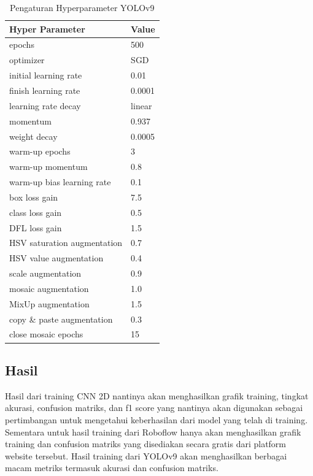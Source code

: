 \begin{table}[H]
  \centering
  \begin{tabular}{|l|l|}
    \hline
    \textbf{Hyper Parameter}    & \textbf{Value} \\ \hline
    epochs                      & 500            \\ \hline
    optimizer                   & SGD            \\ \hline
    initial learning rate       & 0.01           \\ \hline
    finish learning rate        & 0.0001         \\ \hline
    learning rate decay         & linear         \\ \hline
    momentum                    & 0.937          \\ \hline
    weight decay                & 0.0005         \\ \hline
    warm-up epochs              & 3              \\ \hline
    warm-up momentum            & 0.8            \\ \hline
    warm-up bias learning rate  & 0.1            \\ \hline
    box loss gain               & 7.5            \\ \hline
    class loss gain             & 0.5            \\ \hline
    DFL loss gain               & 1.5            \\ \hline
    HSV saturation augmentation & 0.7            \\ \hline
    HSV value augmentation      & 0.4            \\ \hline
    scale augmentation          & 0.9            \\ \hline
    mosaic augmentation         & 1.0            \\ \hline
    MixUp augmentation          & 1.5            \\ \hline
    copy \& paste augmentation  & 0.3            \\ \hline
    close mosaic epochs         & 15             \\ \hline
  \end{tabular}
  \caption{Pengaturan Hyperparameter YOLOv9}
  \label{tab:hyperparameters}
\end{table}

\subsection{Hasil}
Hasil dari training CNN 2D nantinya akan menghasilkan grafik training, tingkat akurasi, confusion matriks, dan f1 score yang nantinya akan digunakan sebagai pertimbangan untuk mengetahui keberhasilan dari model yang telah di training. Sementara untuk hasil training dari Roboflow hanya akan menghasilkan grafik training  dan confusion matriks yang disediakan secara gratis dari platform website tersebut. Hasil training dari YOLOv9 akan menghasilkan berbagai macam metriks termasuk akurasi dan confusion matriks.

